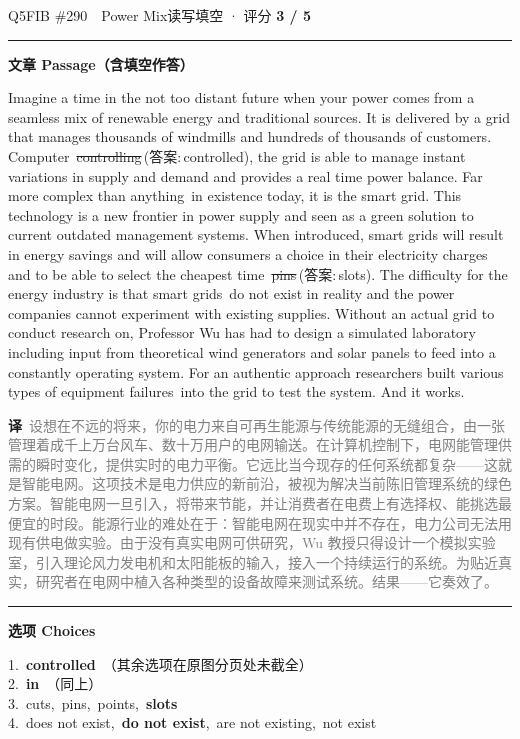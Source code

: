 \documentclass[11pt]{article}
\newcommand{\ptesub}[1]{%
  \par\needspace{2\baselineskip}\smallskip
  {\color{cAccent}\rule[-0.2ex]{3pt}{1.05em}}\hspace{6pt}%
  {\bfseries\color{cHead}#1}\par\nopagebreak\smallskip}
\newcommand{\zh}[1]{{\footnotesize\textcolor{cNote}{\textbf{译}}\ \textcolor{gray}{#1}}}
\newcommand{\rok}[1]{{\color{cFix}\ding{51}\,#1}}                 %
\newcommand{\rno}[2]{{\color{cWrong}\ding{55}\,\sout{#1}}\,{\footnotesize\color{cFix}(答案:\,#2)}}  %
\begin{document}
\begin{qblock}{Q5\quad FIB \#290\ \ Power Mix}{读写填空 · 评分 \textcolor{cAccent}{\bfseries 3 / 5}}
\ptesub{文章 Passage（含填空作答）}
\begin{promptbox}
Imagine a time in the not too distant future when your power comes from a seamless mix of renewable energy and traditional sources. It is delivered by a grid that manages thousands of windmills and hundreds of thousands of customers. Computer \rno{controlling}{controlled}, the grid is able to manage instant variations in supply and demand and provides a real time power balance. Far more complex than anything \rok{in} existence today, it is the smart grid. This technology is a new frontier in power supply and seen as a green solution to current outdated management systems. When introduced, smart grids will result in energy savings and will allow consumers a choice in their electricity charges and to be able to select the cheapest time \rno{pins}{slots}. The difficulty for the energy industry is that smart grids \rok{do not exist} in reality and the power companies cannot experiment with existing supplies. Without an actual grid to conduct research on, Professor Wu has had to design a simulated laboratory including input from theoretical wind generators and solar panels to feed into a constantly operating system. For an authentic approach researchers built various types of equipment failures \rok{into} the grid to test the system. And it works.
\end{promptbox}
\zh{设想在不远的将来，你的电力来自可再生能源与传统能源的无缝组合，由一张管理着成千上万台风车、数十万用户的电网输送。在计算机控制下，电网能管理供需的瞬时变化，提供实时的电力平衡。它远比当今现存的任何系统都复杂——这就是智能电网。这项技术是电力供应的新前沿，被视为解决当前陈旧管理系统的绿色方案。智能电网一旦引入，将带来节能，并让消费者在电费上有选择权、能挑选最便宜的时段。能源行业的难处在于：智能电网在现实中并不存在，电力公司无法用现有供电做实验。由于没有真实电网可供研究，Wu 教授只得设计一个模拟实验室，引入理论风力发电机和太阳能板的输入，接入一个持续运行的系统。为贴近真实，研究者在电网中植入各种类型的设备故障来测试系统。结果——它奏效了。}
\ptesub{选项 Choices}
{\small
1.\ \textbf{controlled}\ {\footnotesize\color{gray}（其余选项在原图分页处未截全）}\\
2.\ \textbf{in}\ {\footnotesize\color{gray}（同上）}\\
3.\ cuts,\ pins,\ points,\ \textbf{slots}\\
4.\ does not exist,\ \textbf{do not exist},\ are not existing,\ not exist\\
}
\end{qblock}
\end{document}
